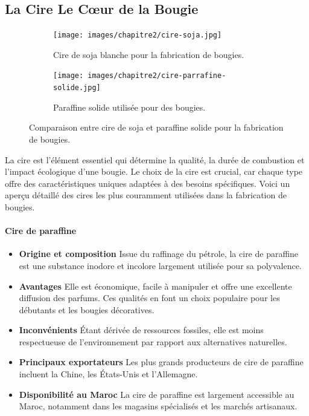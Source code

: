 \documentclass[11pt,fleqn,onecolumn,oneside]{book}
\begin{document}
\subsection*{La Cire Le Cœur de la Bougie}


\begin{figure}[htbp]
    \centering
    \begin{subfigure}[b]{0.45\textwidth} %
        \texttt{[image: images/chapitre2/cire-soja.jpg]}
        \caption{Cire de soja blanche pour la fabrication de bougies.}
        \label{fig:cire_soja}
    \end{subfigure}
    \hfill %
    \begin{subfigure}[b]{0.45\textwidth} %
        \texttt{[image: images/chapitre2/cire-parrafine-solide.jpg]}
        \caption{Paraffine solide utilisée pour des bougies.}
        \label{fig:paraffine_solide}
    \end{subfigure}
    \caption{Comparaison entre cire de soja et paraffine solide pour la fabrication de bougies.}
    \label{fig:comparaison_cires}
\end{figure}

\begin{definition}
La cire est l’élément essentiel qui détermine la qualité, la durée de combustion et l’impact écologique d’une bougie. Le choix de la cire est crucial, car chaque type offre des caractéristiques uniques adaptées à des besoins spécifiques. Voici un aperçu détaillé des cires les plus couramment utilisées dans la fabrication de bougies.
\end{definition}

\paragraph{Cire de paraffine}
\begin{itemize}
    \item \textbf{Origine et composition} Issue du raffinage du pétrole, la cire de paraffine est une substance inodore et incolore largement utilisée pour sa polyvalence.
    \item \textbf{Avantages} Elle est économique, facile à manipuler et offre une excellente diffusion des parfums. Ces qualités en font un choix populaire pour les débutants et les bougies décoratives.
    \item \textbf{Inconvénients} Étant dérivée de ressources fossiles, elle est moins respectueuse de l’environnement par rapport aux alternatives naturelles.
    \item \textbf{Principaux exportateurs} Les plus grands producteurs de cire de paraffine incluent la Chine, les États-Unis et l’Allemagne.
    \item \textbf{Disponibilité au Maroc} La cire de paraffine est largement accessible au Maroc, notamment dans les magasins spécialisés et les marchés artisanaux.
\end{itemize}
\end{document}
